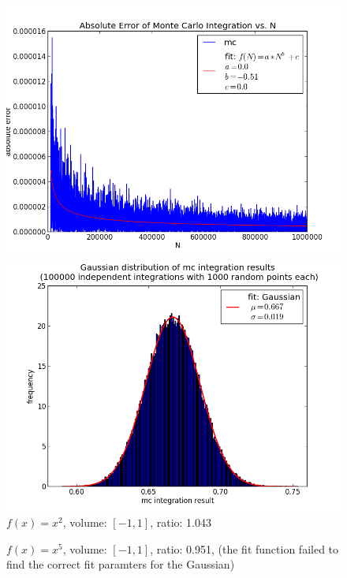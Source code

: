 \documentclass[12pt,a4paper,titlepage]{article}
\begin{document}
\begin{appendix}
\begin{figure}
	\centering
	\caption{$f(x)=x^2$, volume: $[-1,1]$, ratio: 1.043}
	\begin{minipage}[b]{\linewidth}
		\centering
		\includegraphics[width=\linewidth]{Plots/quadratisch}
	\end{minipage}
	\begin{minipage}[b]{\linewidth}
		\centering
		\includegraphics[width=\linewidth]{Plots/histQuadratisch}
	\end{minipage}
	\label{fig:linear}
\end{figure}
\begin{figure}
	\centering
	\caption{$f(x)=x^5$, volume: $[-1,1]$, ratio: 0.951, (the fit function failed to find the correct fit paramters for the Gaussian)}

\end{figure}
\end{appendix}
\end{document}
